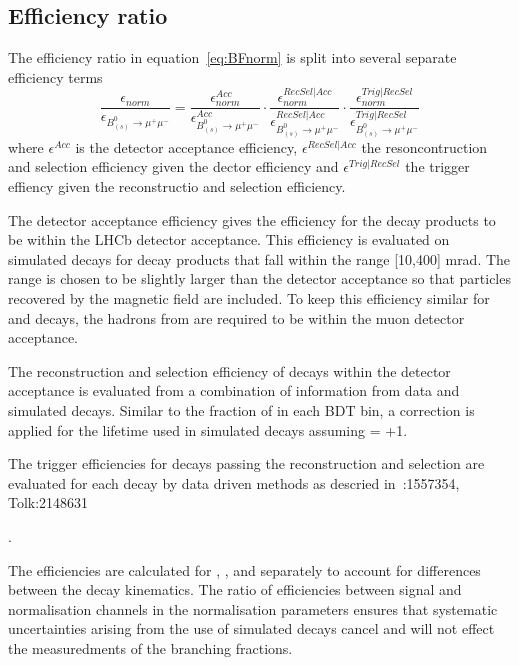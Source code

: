 {{\subsection{Efficiency ratio}
The efficiency ratio in equation~\ref{eq:BFnorm} is split into several separate efficiency terms 
\begin{equation}
\frac{\epsilon_{norm}}{\epsilon_{B^{0}_{(s)} \to \mu^{+} \mu^{-}}}  =  \frac{\epsilon^{Acc}_{norm}}{\epsilon^{Acc}_{B^{0}_{(s)} \to \mu^{+} \mu^{-}}} \cdot \frac{\epsilon^{RecSel|Acc}_{norm}}{\epsilon^{RecSel|Acc}_{B^{0}_{(s)} \to \mu^{+} \mu^{-}}} \cdot \frac{\epsilon^{Trig|RecSel}_{norm}}{\epsilon^{Trig|RecSel}_{B^{0}_{(s)} \to \mu^{+} \mu^{-}}}
\label{eq:BFnormDetailed}
\end{equation}
where $\epsilon^{Acc}$ is the detector acceptance efficiency, $\epsilon^{RecSel|Acc}$ the resoncontruction and selection efficiency given the dector efficiency and $\epsilon^{Trig|RecSel}$ the trigger effiency given the reconstructio and selection efficiency.

The detector acceptance efficiency gives the efficiency for the decay products to be within the LHCb detector acceptance. This efficiency is evaluated on simulated decays for decay products that fall within the range [10,400] mrad. The range is chosen to be slightly larger than the detector acceptance so that particles recovered by the magnetic field are included. To keep this efficiency similar for \bmumu and \bdkpi decays, the hadrons from \bdkpi are required to be within the muon detector acceptance. 

The reconstruction and selection efficiency of decays within the detector acceptance is evaluated from a combination of information from data and simulated decays. Similar to the fraction of \bsmumu in each BDT bin, a correction is applied for the lifetime used in simulated \bsmumu decays assuming \ADG = +1. 

The trigger efficiencies for decays passing the reconstruction and selection are evaluated for each decay by data driven methods as descried in~\citeTolk:1557354, Tolk:2148631}. 

The efficiencies are calculated for \bsmumu, \bdmumu, \bdkpi and \bujpsik separately to account for differences between the decay kinematics. The ratio of efficiencies between signal and normalisation channels in the normalisation parameters ensures that systematic uncertainties arising from the use of simulated decays cancel and will not effect the measuredments of the \bmumu branching fractions.

}
